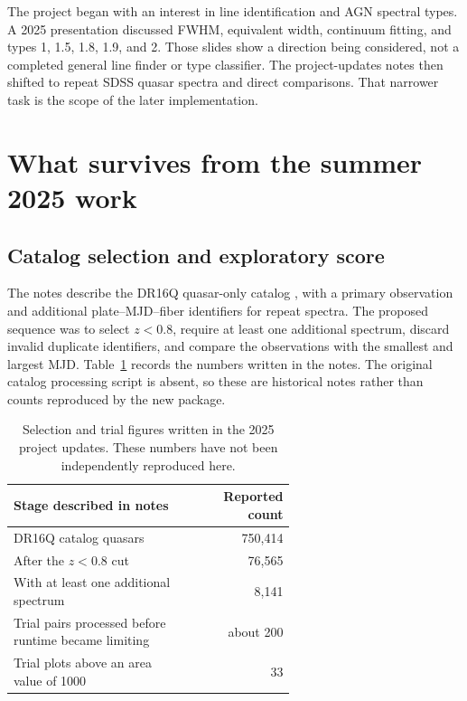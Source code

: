 \documentclass[11pt,a4paper]{article}
\begin{document}
The project began with an interest in line identification and AGN spectral types. A 2025 presentation discussed FWHM, equivalent width, continuum fitting, and types 1, 1.5, 1.8, 1.9, and 2. Those slides show a direction being considered, not a completed general line finder or type classifier. The project-updates notes then shifted to repeat SDSS quasar spectra and direct comparisons. That narrower task is the scope of the later implementation.

\section{What survives from the summer 2025 work}
\subsection{Catalog selection and exploratory score}
The notes describe the DR16Q quasar-only catalog \cite{lyke2020}, with a primary observation and additional plate--MJD--fiber identifiers for repeat spectra. The proposed sequence was to select $z<0.8$, require at least one additional spectrum, discard invalid duplicate identifiers, and compare the observations with the smallest and largest MJD. Table~\ref{tab:history} records the numbers written in the notes. The original catalog processing script is absent, so these are historical notes rather than counts reproduced by the new package.

\begin{table}[htbp]
\centering
\caption{Selection and trial figures written in the 2025 project updates. These numbers have not been independently reproduced here.}
\label{tab:history}
\begin{tabular}{p{0.62\linewidth}r}
\toprule
Stage described in notes & Reported count \\
\midrule
DR16Q catalog quasars & 750,414 \\
After the $z<0.8$ cut & 76,565 \\
With at least one additional spectrum & 8,141 \\
Trial pairs processed before runtime became limiting & about 200 \\
Trial plots above an area value of 1000 & 33 \\
\bottomrule
\end{tabular}
\end{table}
\end{document}
